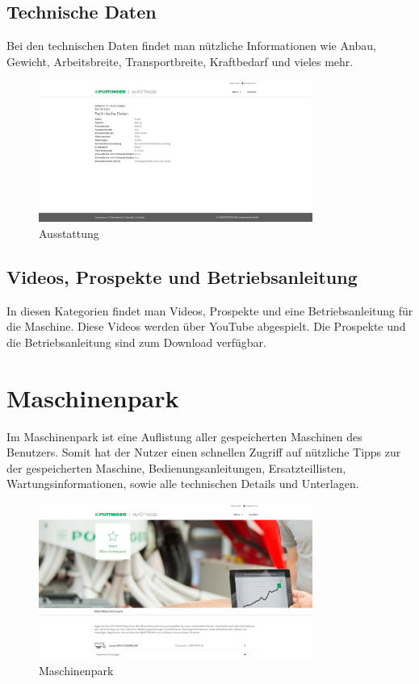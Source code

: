 \subsection{Technische Daten}

Bei den technischen Daten findet man nützliche Informationen wie Anbau, Gewicht, Arbeitsbreite, Transportbreite, Kraftbedarf und vieles mehr.

\begin{figure}[H]
	\centerline{
		\includegraphics[width=0.8\textwidth]{./grafiken/erm_detailansicht_technisch.PNG}
	}
	\vskip0pt
	\caption{Ausstattung} \label{fig:ausstattung}
\end{figure}

\subsection{Videos, Prospekte und Betriebsanleitung}

In diesen Kategorien findet man Videos, Prospekte und eine Betriebsanleitung für die Maschine. Diese Videos werden über YouTube abgespielt. Die Prospekte und die Betriebsanleitung sind zum Download verfügbar.

\section{Maschinenpark}

Im Maschinenpark ist eine Auflistung aller gespeicherten Maschinen des Benutzers. Somit hat der Nutzer einen schnellen Zugriff auf nützliche Tipps zur der gespeicherten Maschine, Bedienungsanleitungen, Ersatzteillisten, Wartungsinformationen, sowie alle technischen Details und Unterlagen.

\begin{figure}[H]
	\centerline{
		\includegraphics[width=0.8\textwidth]{./grafiken/erm_maschinenpark.png}
	}
	\vskip0pt
	\caption{Maschinenpark} \label{fig:maschinenpark}
\end{figure}

